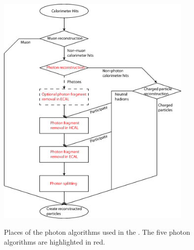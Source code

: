 \begin{figure}[tbph]
\centering
{\includegraphics[width=0.85\textwidth]{photon/photonAlgs2}}
\caption[A flow diagram of the \PhotonReconstruction algorithm.]
{Places of the photon algorithms used  in the \pandora. The five photon algorithms are highlighted in red.}
\label{fig:photonPhotonAlgs}
\end{figure}




